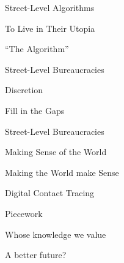 \documentclass[aspectratio=43,17pt]{beamer} %
\newcommand{\onlyinsubfile}[1]{#1}
\newcommand{\notinsubfile}[1]{}
\begin{document}
\renewcommand{\onlyinsubfile}[1]{}
\renewcommand{\notinsubfile}[1]{#1}



\begin{frame}[standout]
Street-Level Algorithms
\end{frame}

\begin{frame}[standout]
To Live in Their Utopia
\end{frame}

\begin{frame}[standout]
``The Algorithm''
\end{frame}

\begin{frame}[standout]
Street-Level Bureaucracies
\end{frame}


\begin{frame}[standout]
Discretion
\end{frame}


\begin{frame}[standout]
Fill in the Gaps
\end{frame}


\begin{frame}[standout]
Street-Level Bureaucracies
\end{frame}


\begin{frame}[standout]
Making \alert{Sense} of the {World}
\end{frame}


\begin{frame}[standout]
Making the \alert{World} make {Sense}
\end{frame}

\begin{frame}[standout]
Digital Contact Tracing
\end{frame}

\begin{frame}[standout]
Piecework
\end{frame}


\begin{frame}[standout]
\alert{Whose} knowledge we value
\end{frame}


\begin{frame}[standout]
A better future?
\end{frame}
\end{document}
